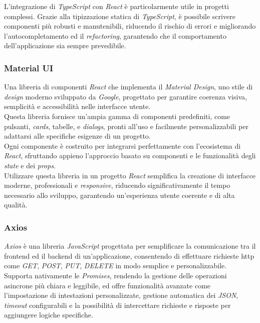 \noindent L’integrazione di \textit{TypeScript} con \textit{React} è particolarmente utile in progetti complessi.
Grazie alla tipizzazione statica di \textit{TypeScript}, è possibile scrivere componenti più robusti e manutenibili, riducendo il rischio di errori e migliorando l’autocompletamento ed il \textit{refactoring},
garantendo che il comportamento dell’applicazione sia sempre prevedibile. \\

\subsubsection{Material UI}
Una libreria di componenti \textit{React} che implementa il \textit{Material Design}, uno stile di \textit{design} moderno sviluppato da \textit{Google}, progettato per garantire coerenza visiva, semplicità e accessibilità nelle interfacce utente.\\

\noindent Questa libreria fornisce un’ampia gamma di componenti predefiniti, come pulsanti, \textit{cards}, tabelle, e \textit{dialogs}, pronti all’uso e facilmente personalizzabili per adattarsi alle specifiche esigenze di un progetto. \\
Ogni componente è costruito per integrarsi perfettamente con l’ecosistema di \textit{React}, sfruttando appieno l’approccio basato su componenti e le funzionalità degli \textit{state} e dei \textit{props}.\\

\noindent Utilizzare questa libreria in un progetto \textit{React} semplifica la creazione di interfacce moderne, professionali e \textit{responsive}, riducendo significativamente il tempo necessario allo sviluppo, garantendo un’esperienza utente coerente e di alta qualità.\\

\subsubsection{Axios}

\textit{Axios} è una libreria \textit{JavaScript} progettata per semplificare la comunicazione tra il \gls{frontend} ed il \gls{backend} di un’applicazione, consentendo di effettuare richieste \gls{http} come \textit{GET}, \textit{POST}, \textit{PUT}, \textit{DELETE} in modo semplice e personalizzabile. \\
Supporta nativamente le \textit{Promises}, rendendo la gestione delle operazioni asincrone più chiara e leggibile, ed offre funzionalità avanzate come l’impostazione di intestazioni personalizzate, gestione automatica dei \textit{JSON},
\textit{timeout} configurabili e la possibilità di intercettare richieste e risposte per aggiungere logiche specifiche.\\

